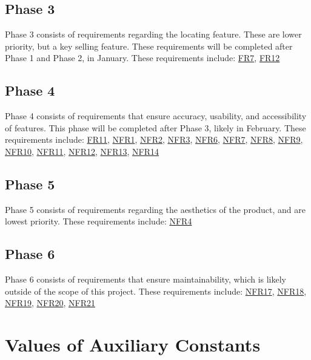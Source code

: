 \documentclass[12pt]{article}
\begin{document}
\subsection{Phase 3}
Phase 3 consists of requirements regarding the locating feature. These are lower priority, but a key selling feature. These requirements will be completed after Phase 1 and Phase 2, in January. These requirements include:
\hyperref[FR7]{FR7}, \hyperref[FR12]{FR12}

\subsection{Phase 4}
Phase 4 consists of requirements that ensure accuracy, usability, and accessibility of features. This phase will be completed after Phase 3, likely in February. These requirements include:
\hyperref[FR11]{FR11}, \hyperref[NFR1]{NFR1}, \hyperref[NFR2]{NFR2}, \hyperref[NFR3]{NFR3}, \hyperref[NFR6]{NFR6}, \hyperref[NFR7]{NFR7}, \hyperref[NFR8]{NFR8}, \hyperref[NFR9]{NFR9}, \hyperref[NFR10]{NFR10}, \hyperref[NFR11]{NFR11}, \hyperref[NFR12]{NFR12}, \hyperref[NFR13]{NFR13}, \hyperref[NFR14]{NFR14}

\subsection{Phase 5}
Phase 5 consists of requirements regarding the aesthetics of the product, and are lowest priority. These requirements include: \hyperref[NFR4]{NFR4}

\subsection{Phase 6}
Phase 6 consists of requirements that ensure maintainability, which is likely outside of the scope of this project. These requirements include: \hyperref[NFR17]{NFR17}, \hyperref[NFR18]{NFR18}, \hyperref[NFR19]{NFR19}, \hyperref[NFR20]{NFR20}, \hyperref[NFR21]{NFR21}

\section{Values of Auxiliary Constants}


\end{document}
